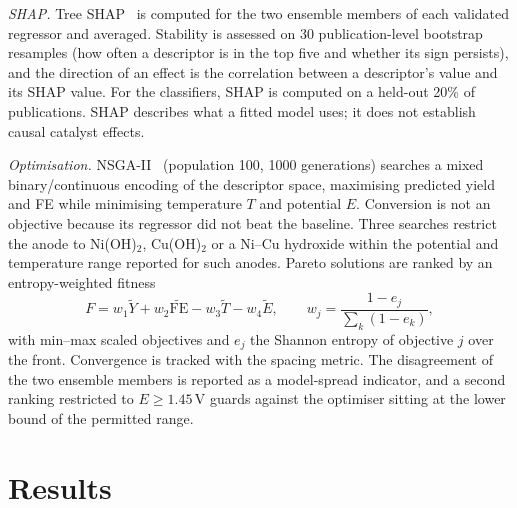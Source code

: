 \documentclass[11pt,a4paper]{article}
\begin{document}
\textit{SHAP.} Tree SHAP~\cite{lundberg2017} is computed for the two ensemble members of each
validated regressor and averaged. Stability is assessed on 30 publication-level bootstrap
resamples (how often a descriptor is in the top five and whether its sign persists), and the
direction of an effect is the correlation between a descriptor's value and its SHAP value.
For the classifiers, SHAP is computed on a held-out 20\% of publications. SHAP describes what a fitted
model uses; it does not establish causal catalyst effects.

\textit{Optimisation.} NSGA-II~\cite{deb2002} (population 100, 1000 generations) searches a mixed
binary/continuous encoding of the descriptor space, maximising predicted yield and FE while
minimising temperature $T$ and potential $E$. Conversion is not an objective because its
regressor did not beat the baseline. Three searches restrict the anode to Ni(OH)$_2$, Cu(OH)$_2$
or a Ni--Cu hydroxide within the potential and temperature range reported for such anodes.
Pareto solutions are ranked by an entropy-weighted fitness
\begin{equation}
F = w_1\tilde Y + w_2\widetilde{\mathrm{FE}} - w_3\tilde T - w_4\tilde E,
\qquad w_j = \frac{1-e_j}{\sum_k (1-e_k)},
\end{equation}
with min--max scaled objectives and $e_j$ the Shannon entropy of objective $j$ over the front.
Convergence is tracked with the spacing metric. The disagreement of the two ensemble members is
reported as a model-spread indicator, and a second ranking restricted to $E\geq1.45$\,V
guards against the optimiser sitting at the lower bound of the permitted range.
\section{Results}
\end{document}

